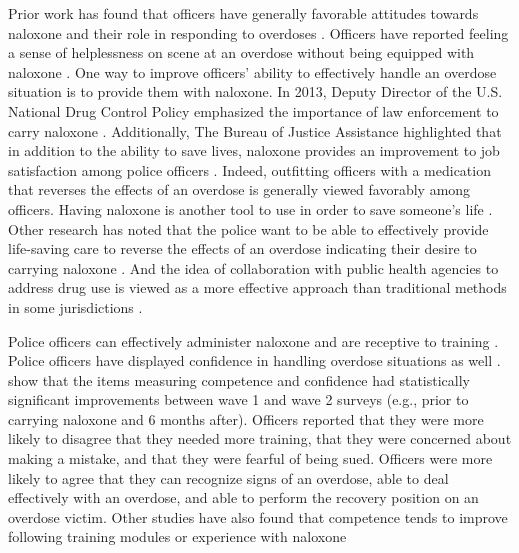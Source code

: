 Prior work has found that officers have generally favorable attitudes towards naloxone and their role in responding to overdoses \parencite{purviance_law_2017, wagner_training_2016, white_narcan_2021}. Officers have reported feeling a sense of helplessness on scene at an overdose without being equipped with naloxone \parencite{banta-green_police_2013, white_moving_2021}. One way to improve officers’ ability to effectively handle an overdose situation is to provide them with naloxone. In 2013, Deputy Director of the U.S. National Drug Control Policy emphasized the importance of law enforcement to carry naloxone \parencite{michael_botticelli_announcing_2013}. Additionally, The Bureau of Justice Assistance highlighted that in addition to the ability to save lives, naloxone provides an improvement to job satisfaction among police officers \parencite{bureau_of_justice_assistance_law_nodate}. Indeed, outfitting officers with a medication that reverses the effects of an overdose is generally viewed favorably among officers. Having naloxone is another tool to use in order to save someone's life \parencite{lloyd_its_2023}. Other research has noted that the police want to be able to effectively provide life-saving care to reverse the effects of an overdose indicating their desire to carrying naloxone \parencite{purviance_law_2017}. And the idea of collaboration with public health agencies to address drug use is viewed as a more effective approach than traditional methods in some jurisdictions \parencite{lloyd_its_2023}.

Police officers can effectively administer naloxone and are receptive to training \parencite{lloyd_its_2023, pourtaher_naloxone_2022, purviance_law_2017, wagner_training_2016}. Police officers have displayed confidence in handling overdose situations as well \parencite{purviance_law_2017, ray_police_2015}. \textcite{white_narcan_2021} show that the items measuring competence and confidence had statistically significant improvements between wave 1 and wave 2 surveys (e.g., prior to carrying naloxone and 6 months after). Officers reported that they were more likely to disagree that they needed more training, that they were concerned about making a mistake, and that they were fearful of being sued. Officers were more likely to agree that they can recognize signs of an overdose, able to deal effectively with an overdose, and able to perform the recovery position on an overdose victim. Other studies have also found that competence tends to improve following training modules or experience with naloxone \parencite{wagner_training_2016} 

